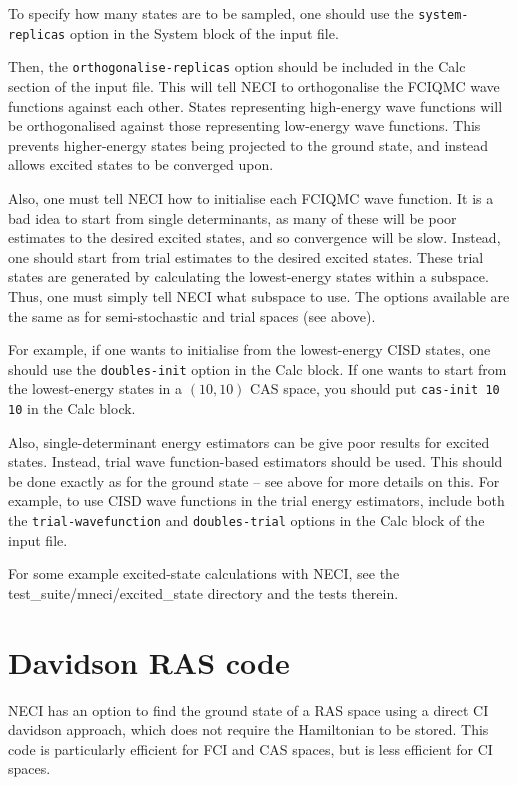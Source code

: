 \documentclass[a4paper,notitlepage,dvipsnames]{scrreprt}
\let\code\lstinline
\begin{document}
    To specify how many states are to be sampled, one should use the
    \code{system-replicas} option in the System block of the input file.

    Then, the \code{orthogonalise-replicas} option should be included in
    the Calc section of the input file. This will tell NECI to orthogonalise
    the FCIQMC wave functions against each other. States representing
    high-energy wave functions will be orthogonalised against those
    representing low-energy wave functions. This prevents higher-energy
    states being projected to the ground state, and instead allows
    excited states to be converged upon.

    Also, one must tell NECI how to initialise each FCIQMC wave function.
    It is a bad idea to start from single determinants, as many of these
    will be poor estimates to the desired excited states, and so
    convergence will be slow. Instead, one should start from trial estimates
    to the desired excited states. These trial states are generated by
    calculating the lowest-energy states within a subspace.
    Thus, one must simply tell NECI what subspace to use. The options
    available are the same as for semi-stochastic and trial spaces (see above).

    For example, if one wants to initialise from the lowest-energy CISD states,
    one should use the \code{doubles-init} option in the Calc block. If one
    wants to start from the lowest-energy states in a $(10,10)$ CAS space, you
    should put \code{cas-init 10 10} in the Calc block.

    Also, single-determinant energy estimators can be give poor results for
    excited states. Instead, trial wave function-based estimators should be
    used. This should be done exactly as for the ground state -- see above for
    more details on this. For example, to use CISD wave functions in the trial
    energy estimators, include both the \code{trial-wavefunction} and
    \code{doubles-trial} options in the Calc block of the input file.

    For some example excited-state calculations with NECI, see the
    test\_suite/mneci/excited\_state directory and the tests therein.

\section{Davidson RAS code}

    NECI has an option to find the ground state of a RAS space using a
    direct CI davidson approach, which does not require the Hamiltonian to be
    stored. This code is particularly efficient for FCI and CAS spaces, but is
    less efficient for CI spaces.
\end{document}

